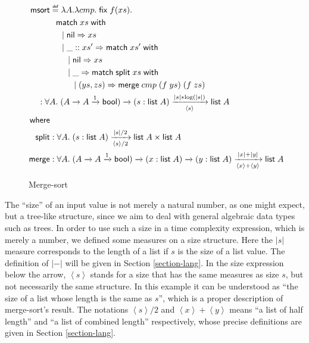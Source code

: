 \documentclass[preprint]{sigplanconf}
\newcommand{\arrow}[4]{#1\xrightarrow[#3]{#2}#4}
\newcommand{\symmatch}{\mathsf{match}}
\newcommand{\symwith}{\mathsf{\;with\;}}
\newcommand{\symlist}{\mathsf{list}}
\newcommand{\symnil}{\mathsf{nil}}
\newcommand{\symfix}{\mathsf{fix}}
\newcommand{\symbool}{\mathsf{bool}}
\newcommand{\symmerge}{\mathsf{merge}}
\newcommand{\intro}[2]{(#1 : #2)}
\newcommand{\symmsort}{\mathsf{msort}}
\newcommand{\symsplit}{\mathsf{split}}
\newcommand\defeq{\mathrel{\overset{\makebox[0pt]{\mbox{\normalfont\tiny\sffamily def}}}{=}}}
\newcommand{\Sstats}[1]{\left \langle #1 \right \rangle}
\begin{document}
\begin{figure}
\begin{align*}
\symmsort &\defeq \lambda A. \lambda cmp.\;\symfix\;f(xs). \\
& \hspace{.1in} \symmatch\;xs\symwith \\
& \hspace{.2in} |\; \symnil\Rightarrow xs \\
& \hspace{.2in} |\; \_::xs' \Rightarrow \symmatch\;xs'\symwith \\
& \hspace{.3in} |\; \symnil\Rightarrow xs \\
& \hspace{.3in} |\; \_ \Rightarrow \symmatch\; \symsplit\;xs \symwith \\
& \hspace{.4in} |\; (ys, zs) \Rightarrow \symmerge\;cmp\;(f\;ys)\;(f\;zs) \\
& \hspace{-0.2in} : \forall A.\;\arrow{(\arrow{A}{}{}{\arrow{A}{1}{}{\symbool}})}{}{}{\arrow{\intro{s}{\symlist\;A}}{|s|*\log(|s|)}{\Sstats{s}}{\symlist\;A}} \\
\mathsf{where} & \\
\symsplit &: \forall A.\;\arrow{\intro{s}{\symlist\;A}}{|s|/2}{\Sstats{s}/2}{\symlist\;A\times\symlist\;A} \\
\symmerge &: \forall A.\;\arrow{(\arrow{A}{}{}{\arrow{A}{1}{}{\symbool}})}{}{}{\arrow{\intro{x}{\symlist\;A}}{}{}{\arrow{\intro{y}{\symlist\;A}}{|x|+|y|}{\Sstats{x}+\Sstats{y}}{\symlist\;A}}}
\end{align*}
\caption{\label{msort}Merge-sort}
\end{figure}

The ``size'' of an input value is not merely a natural number, as one might expect, but a tree-like structure, since we aim to deal with general algebraic data types such as trees. In order to use such a size in a time complexity expression, which is merely a number, we defined some measures on a size structure. Here the $|s|$ measure corresponds to the length of a list if $s$ is the size of a list value. The definition of $|-|$ will be given in Section \ref{section-lang}. In the size expression below the arrow, $\Sstats{s}$ stands for a size that has the same measures as size $s$, but not necessarily the same structure. In this example it can be understood as ``the size of a list whose length is the same as $s$'', which is a proper description of merge-sort's result.  The notations $\Sstats{s}/2$ and $\Sstats{x}+\Sstats{y}$ means ``a list of half length'' and ``a list of combined length'' respectively, whose precise definitions are given in Section \ref{section-lang}.
\end{document}
